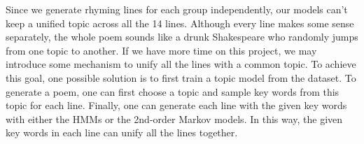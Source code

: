 Since we generate rhyming lines for each group independently, our models can't keep a unified topic across all the 14 lines. Although every line makes some sense separately, the whole poem sounds like a drunk Shakespeare who randomly jumps from one topic to another. If we have more time on this project, we may introduce some mechanism to unify all the lines with a common topic. To achieve this goal, one possible solution is to first train a topic model from the dataset. To generate a poem, one can first choose a topic and sample key words from this topic for each line. Finally, one can generate each line with the given key words with either the HMMs or the 2nd-order Markov models. In this way, the given key words in each line can unify all the lines together. 